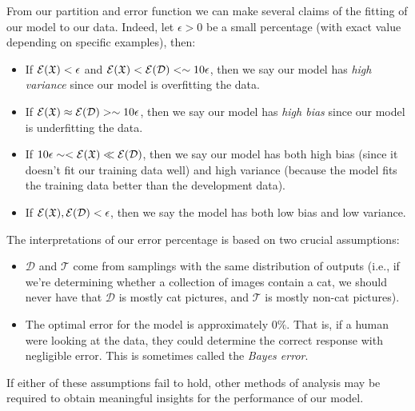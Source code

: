 From our partition and error function we can make several claims of the fitting of our model to our data.  Indeed, let $\epsilon>0$ be a small percentage (with exact value depending on specific examples), then:
\begin{itemize}
	\item If $\mathcal{E}(\frak{X})<\epsilon$ and $\mathcal{E}(\frak{X})<\mathcal{E}(\mathcal{D})<\sim10\epsilon$, then we say our model has \textit{high variance} since our model is overfitting the data.
	\item If $\mathcal{E}(\frak{X})\approx\mathcal{E}(\mathcal{D})>\sim10\epsilon$, then we say our model has \textit{high bias} since our model is underfitting the data.
	\item If $10\epsilon\sim<\mathcal{E}(\frak{X})\ll\mathcal{E}(\mathcal{D})$, then we say our model has both high bias (since it doesn't fit our training data well) and high variance (because the model fits the training data better than the development data).
	\item If $\mathcal{E}(\frak{X}),\mathcal{E}(\mathcal{D})<\epsilon$, then we say the model has both low bias and low variance.
\end{itemize}

\begin{remark}
	The interpretations of our error percentage is based on two crucial assumptions:
	\begin{itemize}
		\item $\mathcal{D}$ and $\mathcal{T}$ come from samplings with the same distribution of outputs (i.e., if we're determining whether a collection of images contain a cat, we should never have that $\mathcal{D}$ is mostly cat pictures, and $\mathcal{T}$ is mostly non-cat pictures).
		\item The optimal error for the model is approximately $0\%$.  That is, if a human were looking at the data, they could determine the correct response with negligible error.  This is sometimes called the \textit{Bayes error}.
	\end{itemize}
	If either of these assumptions fail to hold, other methods of analysis may be required to obtain meaningful insights for the performance of our model.
\end{remark}

